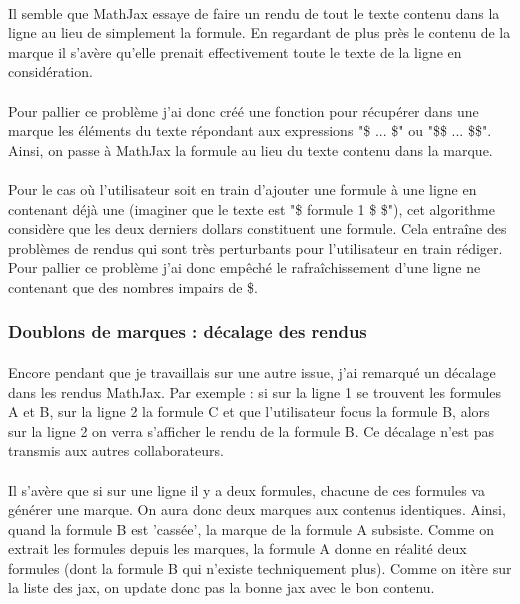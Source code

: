 \documentclass[12pt]{article}
\begin{document}
\paragraph{}
Il semble que MathJax essaye de faire un rendu de tout le texte contenu dans la ligne au lieu de simplement la formule. En regardant de plus près le contenu de la marque il s'avère qu'elle prenait effectivement toute le texte de la ligne en considération.
\paragraph{}
Pour pallier ce problème j'ai donc créé une fonction pour récupérer dans une marque les éléments du texte répondant aux expressions "\$ ... \$" ou "\$\$ ... \$\$". Ainsi, on passe à MathJax la formule au lieu du texte contenu dans la marque.
\paragraph{}
Pour le cas où l'utilisateur soit en train d'ajouter une formule à une ligne en contenant déjà une (imaginer que le texte est "\$ formule 1 \$ \$"), cet algorithme considère que les deux derniers dollars constituent une formule. Cela entraîne des problèmes de rendus qui sont très perturbants pour l'utilisateur en train rédiger. Pour pallier ce problème j'ai donc empêché le rafraîchissement d'une ligne ne contenant que des nombres impairs de \$.\\

\subsubsection{Doublons de marques : décalage des rendus}
\paragraph{}
Encore pendant que je travaillais sur une autre issue, j'ai remarqué un décalage dans les rendus MathJax. Par exemple : si sur la ligne 1 se trouvent les formules A et B, sur la ligne 2 la formule C et que l'utilisateur focus la formule B, alors sur la ligne 2 on verra s'afficher le rendu de la formule B. Ce décalage n'est pas transmis aux autres collaborateurs.
\paragraph{}
Il s'avère que si sur une ligne il y a deux formules, chacune de ces formules va générer une marque. On aura donc deux marques aux contenus identiques. Ainsi, quand la formule B est 'cassée', la marque de la formule A subsiste. Comme on extrait les formules depuis les marques, la formule A donne en réalité deux formules (dont la formule B qui n'existe techniquement plus). Comme on itère sur la liste des jax, on update donc pas la bonne jax avec le bon contenu.
\end{document}
